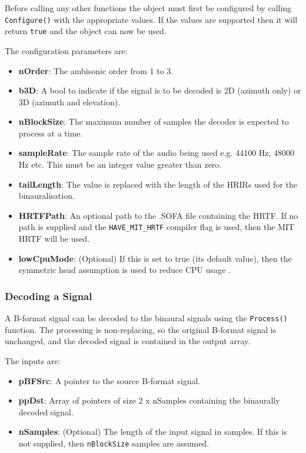 \documentclass[12pt]{report}
\newcommand{\code}[1]{\texttt{#1}}
\begin{document}
Before calling any other functions the object must first be configured by calling \code{Configure()} with the appropriate values. If the values are supported then it will return \code{true} and the object can now be used.

The configuration parameters are:
\begin{itemize}
    \item \textbf{nOrder}: The ambisonic order from 1 to 3.
    \item \textbf{b3D}: A bool to indicate if the signal is to be decoded is 2D (azimuth only) or 3D (azimuth and elevation).
    \item \textbf{nBlockSize}: The maximum number of samples the decoder is expected to process at a time.
    \item \textbf{sampleRate}: The sample rate of the audio being used e.g. 44100 Hz, 48000 Hz etc. This must be an integer value greater than zero.
    \item \textbf{tailLength}: The value is replaced with the length of the HRIRs used for the binauralisation.
    \item \textbf{HRTFPath}: An optional path to the .SOFA file containing the HRTF. If no path is supplied and the \code{HAVE\_MIT\_HRTF} compiler flag is used, then the MIT HRTF will be used.
    \item \textbf{lowCpuMode}: (Optional) If this is set to true (its default value), then the symmetric head assumption is used to reduce CPU usage \cite{politis2016jsambisonics}.
\end{itemize}

\subsubsection{Decoding a Signal}

A B-format signal can be decoded to the binaural signals using the \code{Process()} function. The processing is non-replacing, so the original B-format signal is unchanged, and the decoded signal is contained in the output array.

The inputs are:
\begin{itemize}
    \item \textbf{pBFSrc}: A pointer to the source B-format signal.
    \item \textbf{ppDst}: Array of pointers of size 2 x nSamples containing the binaurally decoded signal.
    \item \textbf{nSamples}: (Optional) The length of the input signal in samples. If this is not supplied, then \code{nBlockSize} samples are assumed.
\end{itemize}
\end{document}
